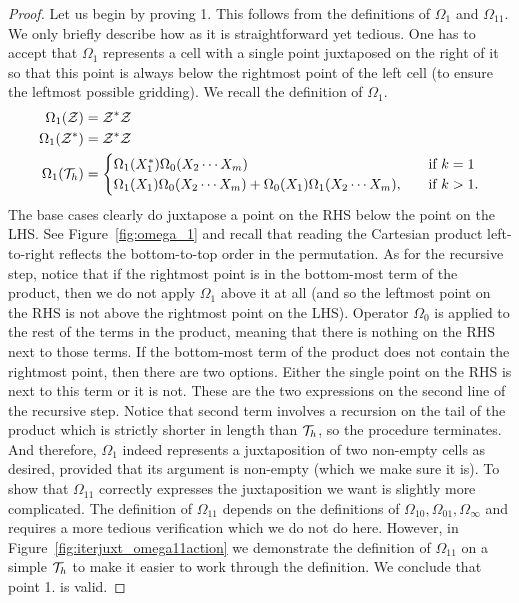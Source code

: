 \documentclass[12pt, a4paper, twoside]{report}
\begin{document}
\begin{proof}
Let us begin by proving 1. This follows from the definitions of $\Omega_1$ and $\Omega_{11}$. We only briefly describe how as it is straightforward yet tedious. One has to accept that $\Omega_1$ represents a cell with a single point juxtaposed on the right of it so that this point is always below the rightmost point of the left cell (to ensure the leftmost possible gridding). We recall the definition of $\Omega_1$.
\begin{align*}
    \Omega_1(\mathcal{Z}) &= \mathcal{Z}^*\mathcal{Z}\\
    \Omega_1(\mathcal{Z}^*) &= \mathcal{Z}^*\mathcal{Z}\\
  \Omega_1(\mathcal{T}_h) &=
                      \begin{cases}
                        \Omega_1(X_1^*)\Omega_0(X_2\cdots X_m) \quad &\text{if $k = 1$}\\
                        \Omega_1(X_1)\Omega_0(X_2\cdots X_m) + \Omega_0(X_1)\Omega_1(X_2\cdots X_m),\quad &\text{if $k>1$.}
                      \end{cases}
\end{align*}
The base cases clearly do juxtapose a point on the RHS below the point on the LHS. See Figure~\ref{fig:omega_1} and recall that reading the Cartesian product left-to-right reflects the bottom-to-top order in the permutation. As for the recursive step, notice that if the rightmost point is in the bottom-most term of the product, then we do not apply $\Omega_1$ above it at all (and so the leftmost point on the RHS is not above the rightmost point on the LHS). Operator $\Omega_0$ is applied to the rest of the terms in the product, meaning that there is nothing on the RHS next to those terms. If the bottom-most term of the product does not contain the rightmost point, then there are two options. Either the single point on the RHS is next to this term or it is not. These are the two expressions on the second line of the recursive step. Notice that second term involves a recursion on the tail of the product which is strictly shorter in length than $\mathcal{T}_h$, so the procedure terminates. And therefore, $\Omega_1$ indeed represents a juxtaposition of two non-empty cells as desired, provided that its argument is non-empty (which we make sure it is). To show that $\Omega_{11}$ correctly expresses the juxtaposition we want is slightly more complicated. The definition of $\Omega_{11}$ depends on the definitions of $\Omega_{10}, \Omega_{01}, \Omega_\infty$ and requires a more tedious verification which we do not do here. However, in Figure~\ref{fig:iterjuxt_omega11action} we demonstrate the definition of $\Omega_{11}$ on a simple $\mathcal{T}_h$ to make it easier to work through the definition. We conclude that point 1. is valid.


\end{proof}
\end{document}
